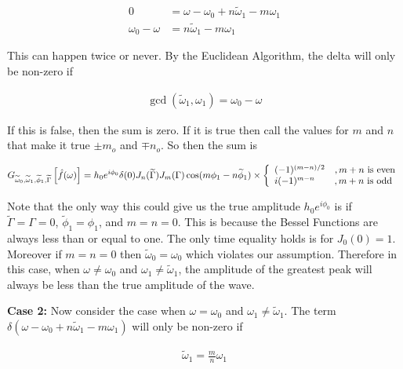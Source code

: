 \documentclass[onecolumn, groupedaddress, 10pt]{revtex4-1}
\begin{document}
\begin{align}
                0 &= \omega - \omega_0 + n\widetilde{\omega}_1 - m\omega_1		\\
\omega_0 - \omega &= n\widetilde{\omega}_1 - m\omega_1
\end{align}

This can happen twice or never.  By the Euclidean Algorithm, the delta will only be non-zero if

\begin{align}
\gcd \left( \widetilde{\omega}_1, \omega_1 \right) = \omega_0 - \omega
\end{align}

If this is false, then the sum is zero.  If it is true then call the values for $m$ and $n$ that make it true $\pm m_o$ and $\mp n_o$.  So then the sum is 

\begin{align}
G_{\widetilde{\omega}_0,\widetilde{\omega}_1,\widetilde{\phi}_1,\widetilde{\Gamma}} \left[ \hat{f}(\omega) \right] = 
h_0 e^{i\phi_0} \delta (0) J_n(\widetilde{\Gamma})J_m(\Gamma) \cos (m\phi_1-n\widetilde{\phi}_1) \times
\left\{
     \begin{array}{lr}
        (-1)^{(m-n)/2} & , m+n $ is even$    \\
		i (-1)^{m-n}   & , m+n $ is odd $
     \end{array}
   \right.
\end{align}

Note that the only way this could give us the true amplitude $h_0 e^{i\phi_0}$ is if $\widetilde{\Gamma} = \Gamma = 0$, $\widetilde{\phi}_1 = \phi_1$, and $m=n=0$.  This is because the Bessel Functions are always less than or equal to one.  The only time equality holds is for $J_0(0)=1$.  Moreover if $m=n=0$ then $\widetilde{\omega}_0 = \omega_0$ which violates our assumption.  Therefore in this case, when $\omega \neq \omega_0$ and $\omega_1 \neq \widetilde{\omega}_1$, the amplitude of the greatest peak will always be less than the true amplitude of the wave.


\textbf{Case 2:}  Now consider the case when $\omega = \omega_0$ and $\omega_1 \neq \widetilde{\omega}_1$.  The term $\delta(\omega - \omega_0 + n\widetilde{\omega}_1 - m\omega_1)$ will only be non-zero if

\begin{align}
\widetilde{\omega}_1 = \frac{m}{n} \omega_1
\end{align}
\end{document}
